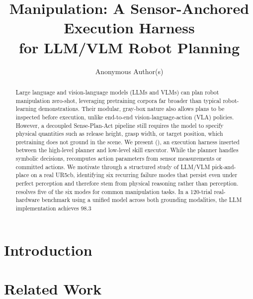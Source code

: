 \documentclass[letterpaper, 10 pt, conference]{ieeeconf}
\begin{document}
\title{\LARGE \bf \harness{} Manipulation: A Sensor-Anchored Execution Harness\\for LLM/VLM Robot Planning}

\author{Anonymous Author(s)}


\maketitle

\begin{abstract}
Large language and vision-language models (LLMs and VLMs) can plan robot manipulation zero-shot, leveraging pretraining corpora far broader than typical robot-learning demonstrations. Their modular, gray-box nature also allows plans to be inspected before execution, unlike end-to-end vision-language-action (VLA) policies. However, a decoupled Sense-Plan-Act pipeline still requires the model to specify physical quantities such as release height, grasp width, or target position, which pretraining does not ground in the scene. We present \harness{} (\harnesslong{}), an execution harness inserted between the high-level planner and low-level skill executor. While the planner handles symbolic decisions, \harness{} recomputes action parameters from sensor measurements or committed actions. We motivate \harness{} through a structured study of LLM/VLM pick-and-place on a real UR5cb, identifying six recurring failure modes that persist even under perfect perception and therefore stem from physical reasoning rather than perception. \harness{} resolves five of the six modes for common manipulation tasks. In a 120-trial real-hardware benchmark using a unified model across both grounding modalities, the LLM implementation achieves 98.3%
\end{abstract}

\section{Introduction}
\label{sec:introduction}


\section{Related Work}
\label{sec:related-work}

\end{document}
